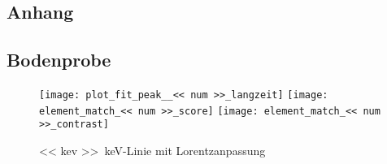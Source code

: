 \documentclass[11pt, ngerman, fleqn, DIV=15, headinclude, BCOR=2cm]{scrreprt}
\begin{document}

\begin{appendix}

\chapter{Anhang}
\section{Bodenprobe}

\begin{figure}
    \centering
    \texttt{[image: plot\_fit\_peak\_\_<< num >>\_langzeit]}
    \texttt{[image: element\_match\_<< num >>\_score]}
    \texttt{[image: element\_match\_<< num >>\_contrast]}
    \caption{%
        \SI{<< kev >>}{\kilo\electronvolt}-Linie
        mit Lorentzanpassung
    }
    \label{fig:}
\end{figure}

\end{appendix}
\end{document}
